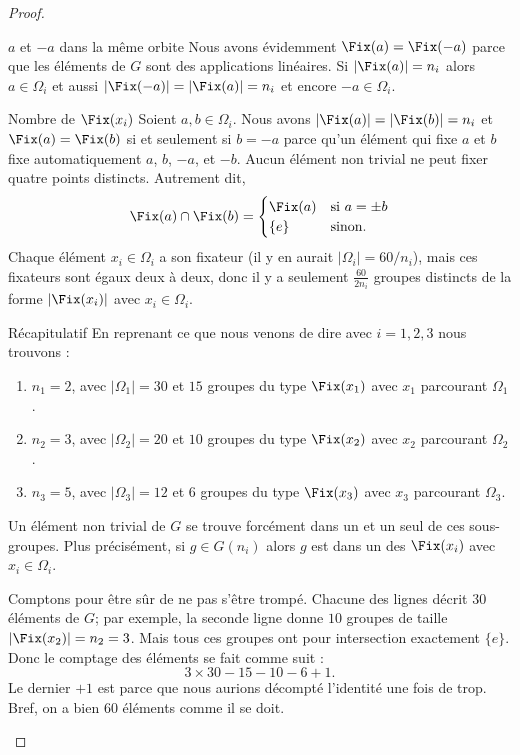 \begin{proof}
\begin{subproof}
		\item[\( a\) et \( -a\) dans la même orbite]
		Nous avons évidemment \( \Fix(a)=\Fix(-a)\) parce que les éléments de \( G\) sont des applications linéaires. Si \( | \Fix(a) |=n_i\) alors \( a\in\Omega_i\) et aussi \( | \Fix(-a) |=| \Fix(a) |=n_i \) et encore \( -a\in \Omega_i\).

		\item[Nombre de \( \Fix(x_i)\)]
		Soient \( a,b\in \Omega_i\). Nous avons \( | \Fix(a) |=| \Fix(b) |=n_i\) et \( \Fix(a)=\Fix(b)\) si et seulement si \( b=-a\) parce qu'un élément qui fixe \( a\) et \( b\) fixe automatiquement \( a\), \( b\), \( -a\), et \( -b\). Aucun élément non trivial ne peut fixer quatre points distincts. Autrement dit,
		\begin{equation}
			\Fix(a)\cap\Fix(b)=\begin{cases}
				\Fix(a) & \text{si } a=\pm b \\
				\{ e \} & \text{sinon. }
			\end{cases}
		\end{equation}
		Chaque élément \( x_i\in \Omega_i\) a son fixateur (il y en aurait \( | \Omega_i |=60/n_i\)), mais ces fixateurs sont égaux deux à deux, donc il y a seulement \( \frac{ 60 }{ 2n_i }\) groupes distincts de la forme \( | \Fix(x_i) |\) avec \( x_i\in \Omega_i\).

		\item[Récapitulatif]
		En reprenant ce que nous venons de dire avec \( i=1,2,3\) nous trouvons :
		\begin{enumerate}
			\item
			      \( n_1=2\), avec \( | \Omega_1 |=30\) et \( 15\) groupes du type \( \Fix(x_1)\) avec \( x_1\) parcourant \( \Omega_1\).
			\item
			      \( n_2=3\), avec \( | \Omega_2 |=20\) et \( 10\) groupes du type \( \Fix(x_2)\) avec \( x_2\) parcourant \( \Omega_2\).
			\item
			      \( n_3=5\), avec \( | \Omega_3|=12\) et \( 6\) groupes du type \( \Fix(x_3)\) avec \( x_3\) parcourant \( \Omega_3\).
		\end{enumerate}
		Un élément non trivial de \( G\) se trouve forcément dans un et un seul de ces sous-groupes. Plus précisément, si \( g\in G(n_i)\) alors \( g\) est dans un des \( \Fix(x_i)\) avec \( x_i\in \Omega_i\).

		Comptons pour être sûr de ne pas s'être trompé. Chacune des lignes décrit \( 30\) éléments de \( G\); par exemple, la seconde ligne donne \( 10\) groupes de taille \( | \Fix(x_2) |=n_2=3\). Mais tous ces groupes ont pour intersection exactement \( \{ e \}\). Donc le comptage des éléments se fait comme suit :
		\begin{equation}
			3\times 30-15-10-6+1.
		\end{equation}
		Le dernier \( +1\) est parce que nous aurions décompté l'identité une fois de trop. Bref, on a bien \( 60\) éléments comme il se doit.


\end{subproof}
\end{proof}
